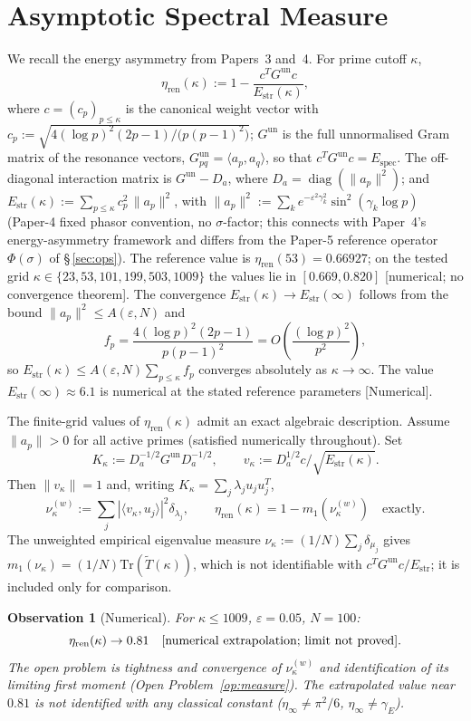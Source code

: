 \documentclass[11pt]{article}
\newtheorem{observation}[theorem]{Observation}
\newcommand{\Estr}{E_{\mathrm{str}}}
\newcommand{\Espec}{E_{\mathrm{spec}}}
\newcommand{\etaren}{\eta_{\mathrm{ren}}}
\newcommand{\Tt}{\widetilde{T}}
\newcommand{\Gun}{G^{\mathrm{un}}}
\begin{document}
\section{Asymptotic Spectral Measure}
\label{sec:asymp}

We recall the energy asymmetry from Papers~3 and~4.
For prime cutoff $\kappa$,
\[
\etaren(\kappa) := 1 - \frac{c^T \Gun c}{\Estr(\kappa)},
\]
where $c=(c_p)_{p\leq\kappa}$ is the canonical weight vector with
$c_p := \sqrt{4(\log p)^2(2p-1)\big/\bigl(p(p-1)^2\bigr)}$;
$\Gun$ is the full unnormalised Gram matrix of the resonance vectors,
$\Gun_{pq}=\langle a_p,a_q\rangle$, so that $c^T\Gun c = \Espec$.
The off-diagonal interaction matrix is $\Gun - D_a$,
where $D_a = \operatorname{diag}(\|a_p\|^2)$;
and $\Estr(\kappa):=\sum_{p\leq\kappa}c_p^2\,\|a_p\|^2$, with
$\|a_p\|^2:=\sum_k e^{-\varepsilon^2\gamma_k^2}\sin^2(\gamma_k\log p)$
(Paper-4 fixed phasor convention, no $\sigma$-factor; this connects with
Paper~4's energy-asymmetry framework and differs from the Paper-5 reference
operator $\Phi(\sigma)$ of \S\,\ref{sec:ops}).
The reference value is $\etaren(53)=0.66927$; on the
tested grid $\kappa\in\{23,53,101,199,503,1009\}$
the values lie in $[0.669, 0.820]$
[numerical; no convergence theorem].
The convergence $\Estr(\kappa)\to\Estr(\infty)$ follows from the bound
$\|a_p\|^2\le A(\varepsilon,N)$ and
\[
  f_p = \frac{4(\log p)^2(2p-1)}{p(p-1)^2}
      = O\!\left(\frac{(\log p)^2}{p^2}\right),
\]
so $\Estr(\kappa)\le A(\varepsilon,N)\sum_{p\le\kappa}f_p$ converges
absolutely as $\kappa\to\infty$.
The value $\Estr(\infty)\approx 6.1$ is numerical at the stated
reference parameters [Numerical].

The finite-grid values of $\etaren(\kappa)$ admit an exact algebraic
description. Assume $\|a_p\|>0$ for all active primes (satisfied
numerically throughout). Set
\[
K_\kappa:=D_a^{-1/2}\Gun D_a^{-1/2},\qquad
v_\kappa:=D_a^{1/2}c/\sqrt{\Estr(\kappa)}.
\]
Then $\|v_\kappa\|=1$ and, writing
$K_\kappa=\sum_j\lambda_j u_j u_j^T$,
\[
\nu_\kappa^{(w)}:=\sum_j|\langle v_\kappa,u_j\rangle|^2\delta_{\lambda_j},
\qquad
\etaren(\kappa)=1-m_1\!\left(\nu_\kappa^{(w)}\right) \quad\text{exactly.}
\]
The unweighted empirical eigenvalue measure
$\nu_\kappa:=(1/N)\sum_j\delta_{\mu_j}$
gives $m_1(\nu_\kappa)=(1/N)\mathrm{Tr}(\Tt(\kappa))$,
which is not identifiable with $c^T\Gun c/\Estr$;
it is included only for comparison.

\begin{observation}[Numerical]
\label{obs:etainf}
For $\kappa\leq 1009$, $\varepsilon=0.05$, $N=100$:
\[
\etaren(\kappa)\to 0.81
\quad\textup{[numerical extrapolation; limit not proved]}.
\]
The open problem is tightness and convergence of $\nu_\kappa^{(w)}$
and identification of its limiting first moment
(Open Problem~\ref{op:measure}).
The extrapolated value near $0.81$ is not identified with
any classical constant ($\eta_\infty\neq\pi^2/6$,
$\eta_\infty\neq\gamma_E$).
\end{observation}
\end{document}
